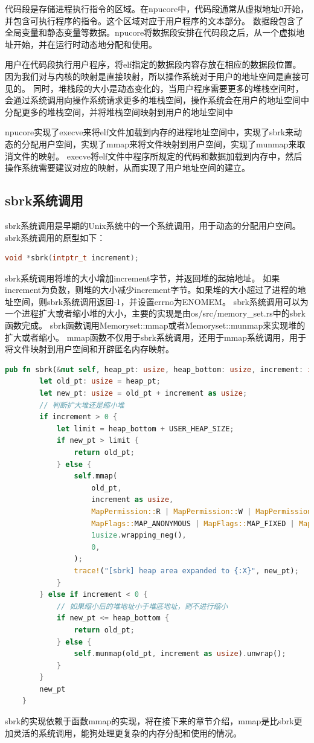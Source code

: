代码段是存储进程执行指令的区域。在npucore中，代码段通常从虚拟地址0开始，并包含可执行程序的指令。这个区域对应于用户程序的文本部分。
数据段包含了全局变量和静态变量等数据。npucore将数据段安排在代码段之后，从一个虚拟地址开始，并在运行时动态地分配和使用。

用户在代码段执行用户程序，将elf指定的数据段内容存放在相应的数据段位置。因为我们对与内核的映射是直接映射，所以操作系统对于用户的地址空间是直接可见的。
同时，堆栈段的大小是动态变化的，当用户程序需要更多的堆栈空间时，会通过系统调用向操作系统请求更多的堆栈空间，操作系统会在用户的地址空间中分配更多的堆栈空间，并将堆栈空间映射到用户的地址空间中

npucore实现了execve来将elf文件加载到内存的进程地址空间中，实现了sbrk来动态的分配用户空间，实现了mmap来将文件映射到用户空间，实现了munmap来取消文件的映射。
execve将elf文件中程序所规定的代码和数据加载到内存中，然后操作系统需要建议对应的映射，从而实现了用户地址空间的建立。


\subsection{sbrk系统调用}
sbrk系统调用是早期的Unix系统中的一个系统调用，用于动态的分配用户空间。sbrk系统调用的原型如下：
\begin{lstlisting}[language=c]
    void *sbrk(intptr_t increment);
\end{lstlisting}
sbrk系统调用将堆的大小增加increment字节，并返回堆的起始地址。
如果increment为负数，则堆的大小减少increment字节。如果堆的大小超过了进程的地址空间，则sbrk系统调用返回-1，并设置errno为ENOMEM。
sbrk系统调用可以为一个进程扩大或者缩小堆的大小，主要的实现是由os/src/memory_set.rs中的sbrk函数完成。
sbrk函数调用Memoryset::mmap或者Memoryset::munmap来实现堆的扩大或者缩小。
mmap函数不仅用于sbrk系统调用，还用于mmap系统调用，用于将文件映射到用户空间和开辟匿名内存映射。
\begin{lstlisting}[language=rust]
    pub fn sbrk(&mut self, heap_pt: usize, heap_bottom: usize, increment: isize) -> usize {
        let old_pt: usize = heap_pt;
        let new_pt: usize = old_pt + increment as usize;
        // 判断扩大堆还是缩小堆
        if increment > 0 {
            let limit = heap_bottom + USER_HEAP_SIZE;
            if new_pt > limit {
                return old_pt;
            } else {
                self.mmap(
                    old_pt,
                    increment as usize,
                    MapPermission::R | MapPermission::W | MapPermission::U,
                    MapFlags::MAP_ANONYMOUS | MapFlags::MAP_FIXED | MapFlags::MAP_PRIVATE,
                    1usize.wrapping_neg(),
                    0,
                );
                trace!("[sbrk] heap area expanded to {:X}", new_pt);
            }
        } else if increment < 0 {
            // 如果缩小后的堆地址小于堆底地址，则不进行缩小
            if new_pt <= heap_bottom {
                return old_pt;
            } else {
                self.munmap(old_pt, increment as usize).unwrap();
            }
        }
        new_pt
    }
\end{lstlisting}
sbrk的实现依赖于函数mmap的实现，将在接下来的章节介绍，mmap是比sbrk更加灵活的系统调用，能狗处理更复杂的内存分配和使用的情况。



